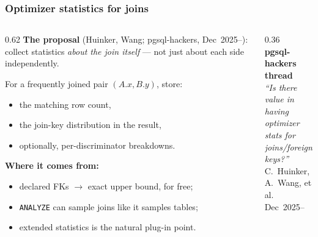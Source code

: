 \documentclass{beamer}
\begin{document}
%

\begin{frame}\frametitle{Optimizer statistics for joins}
\vspace{-1mm}

\begin{columns}[T]
\begin{column}{0.62\textwidth}
\small
\textbf{The proposal} (Huinker, Wang; pgsql-hackers, Dec~2025--):
collect statistics \emph{about the join itself} --- not just about
each side independently.

\vspace{1.5mm}
For a frequently joined pair $(A.x, B.y)$, store:
\begin{itemize}\scriptsize
  \item the matching row count,
  \item the join-key distribution in the result,
  \item optionally, per-discriminator breakdowns.
\end{itemize}

\vspace{1.5mm}
\textbf{Where it comes from:}
\begin{itemize}\scriptsize
  \item declared FKs $\to$ exact upper bound, for free;
  \item \texttt{ANALYZE} can sample joins like it samples tables;
  \item extended statistics is the natural plug-in point.
\end{itemize}
\end{column}
\begin{column}{0.36\textwidth}
\centering
\vspace{2mm}
\\[1.5mm]
{\scriptsize\bfseries pgsql-hackers thread}\\[0.5mm]
{\scriptsize\itshape ``Is there value in having\\optimizer stats for\\joins/foreignkeys?''}\\[1mm]
{\scriptsize C.~Huinker, A.~Wang, et al.\\Dec~2025--}
\end{column}
\end{columns}
\end{frame}
\end{document}
